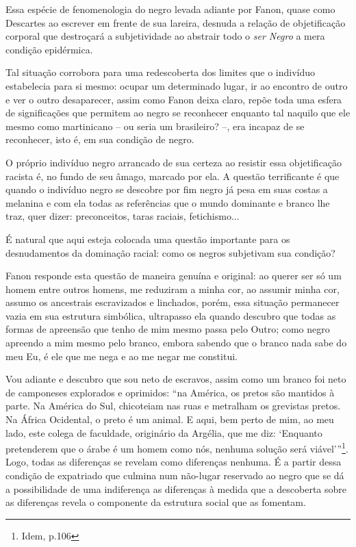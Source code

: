 Essa espécie de fenomenologia do negro levada adiante por Fanon, quase
como Descartes ao escrever em frente de sua lareira, desnuda a relação
de objetificação corporal que destroçará a subjetividade ao abstrair
todo o \emph{ser Negro} a mera condição epidérmica.

Tal situação corrobora para uma redescoberta dos limites que o indivíduo
estabelecia para si mesmo: ocupar um determinado lugar, ir ao encontro
de outro e ver o outro desaparecer, assim como Fanon deixa claro, repõe
toda uma esfera de significações que permitem ao negro se reconhecer
enquanto tal naquilo que ele mesmo como martinicano -- ou seria um
brasileiro? --, era incapaz de se reconhecer, isto é, em sua condição de
negro.

O próprio indivíduo negro arrancado de sua certeza ao resistir essa
objetificação racista é, no fundo de seu âmago, marcado por ela. A
questão terrificante é que quando o indivíduo negro se descobre por fim
negro já pesa em suas costas a melanina e com ela todas as referências
que o mundo dominante e branco lhe traz, quer dizer: preconceitos, taras
raciais, fetichismo...

É natural que aqui esteja colocada uma questão importante para os
desnudamentos da dominação racial: como os negros subjetivam sua
condição?

Fanon responde esta questão de maneira genuína e original: ao querer ser
só um homem entre outros homens, me reduziram a minha cor, ao assumir
minha cor, assumo os ancestrais escravizados e linchados, porém, essa
situação permanecer vazia em sua estrutura simbólica, ultrapasso ela
quando descubro que todas as formas de apreensão que tenho de mim mesmo
passa pelo Outro; como negro apreendo a mim mesmo pelo branco, embora
sabendo que o branco nada sabe do meu Eu, é ele que me nega e ao me
negar me constitui.

Vou adiante e descubro que sou neto de escravos, assim como um branco
foi neto de camponeses explorados e oprimidos: ``na América, os pretos
são mantidos à parte. Na América do Sul, chicoteiam nas ruas e metralham
os grevistas pretos. Na África Ocidental, o preto é um animal. E aqui,
bem perto de mim, ao meu lado, este colega de faculdade, originário da
Argélia, que me diz: `Enquanto pretenderem que o árabe é um homem como
nós, nenhuma solução será viável'''\footnote{Idem, p.106}. Logo, todas
as diferenças se revelam como diferenças nenhuma. É a partir dessa
condição de expatriado que culmina num não-lugar reservado ao negro que
se dá a possibilidade de uma indiferença as diferenças à medida que a
descoberta sobre as diferenças revela o componente da estrutura social
que as fomentam.

